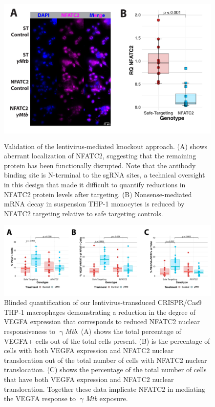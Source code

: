 \begin{figure}
\centering
\includegraphics[height=3in]{images/lentivalid.pdf}
\caption{Validation of the lentivirus-mediated knockout approach. (A) shows aberrant localization of NFATC2, suggesting that the remaining protein has been functionally disrupted. Note that the antibody binding site is N-terminal to the sgRNA sites, a technical oversight in this design that made it difficult to quantify reductions in NFATC2 protein levels after targeting. (B) Nonsense-mediated mRNA decay in suspension THP-1 monocytes is reduced by NFATC2 targeting relative to safe targeting controls.}
\label{figure:validation}
\end{figure}

\begin{figure}
\centering
\includegraphics[width=\textwidth]{images/lentiIFquant.pdf}
\caption{Blinded quantification of our lentivirus-transduced CRISPR/Cas9 THP-1 macrophages demonstrating a reduction in the degree of VEGFA expression that corresponds to reduced NFATC2 nuclear responsiveness to $\upgamma$\textit{Mtb}. (A) shows the total percentage of VEGFA+ cells out of the total cells present. (B) is the percentage of cells with both VEGFA expression and NFATC2 nuclear translocation out of the total number of cells with NFATC2 nuclear translocation. (C) shows the percentage of the total number of cells that have both VEGFA expression and NFATC2 nuclear translocation. Together these data implicate NFATC2 in mediating the VEGFA response to $\upgamma$\textit{Mtb} exposure.}
\label{figure:lentiIFquant}
\end{figure}

